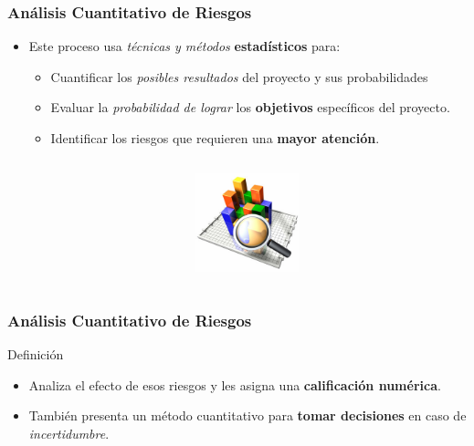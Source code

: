 \frame
{
\frametitle{Análisis Cuantitativo de Riesgos}
\begin{itemize}
	\item Este proceso usa \emph{técnicas y métodos} \textbf{estadísticos} para:
	\begin{itemize}
		\item Cuantificar los \emph{posibles resultados} del proyecto y sus probabilidades
		\item Evaluar la \emph{probabilidad de lograr} los \textbf{objetivos} específicos del proyecto.
		\item Identificar los riesgos que requieren una \textbf{mayor atención}.
	\end{itemize}
\end{itemize}
\begin{columns}
	\begin{column}{0.6\textwidth}
	\end{column}
	\begin{column}{0.4\textwidth}
		\includegraphics[width=3cm]{img/quantity}
	\end{column}
\end{columns}
}

\frame
{
\frametitle{Análisis Cuantitativo de Riesgos}
\begin{block}{Definición}
\begin{itemize}
	\item Analiza el efecto de esos riesgos y les asigna una \textbf{calificación numérica}.
	\item También presenta un método cuantitativo para \textbf{tomar decisiones} en caso de \emph{incertidumbre}. 
\end{itemize}
\end{block}
}


